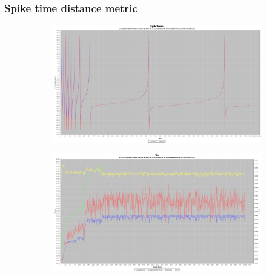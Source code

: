 \documentclass[10pt]{article}
\begin{document}
		\subsubsection{Spike time distance metric}
			\begin{figure}[H]
				\centering
					\begin{subfigure}{.5\textwidth}
						\centering
						\includegraphics[width=\linewidth]{./../images/izzy4/time/plot.png}
						
						\label{fig:sub10a}
					\end{subfigure}%
					\begin{subfigure}{.5\textwidth}
						\centering
						\includegraphics[width=\linewidth]{./../images/izzy4/time/prog.png}
						
						\label{fig:sub10b}
					\end{subfigure}
					
					\label{fig:plot10}
			\end{figure}
			
\end{document}
